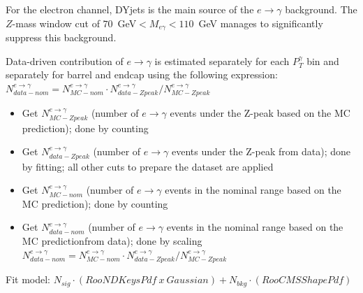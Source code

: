 For the electron channel, DYjets is the main source of the $e \rightarrow \gamma$ background. The $Z$-mass window cut of $70$~GeV$<M_{e\gamma}<110$~GeV manages to significantly suppress this background. 

Data-driven contribution of $e\rightarrow\gamma$ is estimated separately for each $P_{T}^{\gamma}$ bin and separately for barrel and endcap using the following expression:$N_{data-nom}^{e\rightarrow\gamma} = N_{MC-nom}^{e\rightarrow\gamma} \cdot N_{data-Zpeak}^{e\rightarrow\gamma}/N_{MC-Zpeak}^{e\rightarrow\gamma}$ 

\begin{itemize}
  \item Get $N_{MC-Zpeak}^{e\rightarrow\gamma}$ (number of $e\rightarrow\gamma$ events under the Z-peak based on the MC prediction); done by counting
  \item Get $N_{data-Zpeak}^{e\rightarrow\gamma}$ (number of $e\rightarrow\gamma$ events under the Z-peak from data); done by fitting; all other cuts to prepare the dataset are applied
  \item Get $N_{MC-nom}^{e\rightarrow\gamma}$ (number of $e\rightarrow\gamma$ events in the nominal range based on the MC prediction); done by counting
  \item Get $N_{data-nom}^{e\rightarrow\gamma}$ (number of $e\rightarrow\gamma$ events in the nominal range based on the MC predictionfrom data); done by scaling $N_{data-nom}^{e\rightarrow\gamma} = N_{MC-nom}^{e\rightarrow\gamma} \cdot N_{data-Zpeak}^{e\rightarrow\gamma}/N_{MC-Zpeak}^{e\rightarrow\gamma}$
\end{itemize}

Fit model: $N_{sig} \cdot (RooNDKeysPdf~x~Gaussian) +  N_{bkg} \cdot (RooCMSShapePdf)$\\

